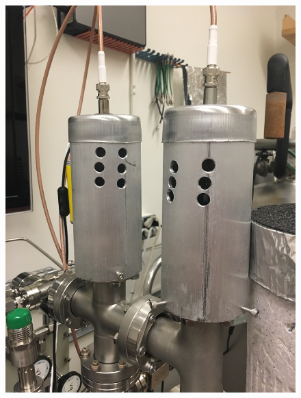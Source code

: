 \begin{figure}[htbp]
\begin{minipage}{0.33\textwidth}
    \includegraphics[width=\linewidth]{figures/testbed/ft6_6.jpg}
    \end{minipage}

    \vspace*{1cm} %


\end{figure}
